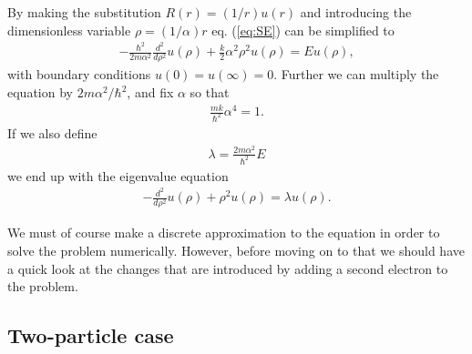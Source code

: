 \documentclass[12pt, a4paper]{article}
\begin{document}
By making the substitution $R(r) = (1/r)u(r)$ and introducing the dimensionless variable 
$\rho = (1/\alpha)r$ eq. (\ref{eq:SE}) can be simplified to 
\begin{align*}
-\frac{\hbar^2}{2m\alpha^2} \frac{d^2}{d\rho^2}u(\rho) + \frac{k}{2}\alpha^2 \rho^2 u(\rho) = Eu(\rho),  
\end{align*} 
with boundary conditions $u(0) = u(\infty) = 0$. 
Further we can multiply the equation by $2m\alpha^2/\hbar^2$, and fix $\alpha$ so that 
\begin{align*}
\frac{mk}{\hbar^2}\alpha^4 = 1.  
\end{align*}
If we also define 
\begin{align*}
\lambda = \frac{2m \alpha^2}{\hbar^2}E 
\end{align*}
we end up with the eigenvalue equation 
\begin{align}
- \frac{d^2}{d\rho^2}u(\rho) + \rho^2u(\rho) = \lambda u(\rho). 
\label{eq:SE_1p_scaled}
\end{align}

We must of course make a discrete approximation to the equation in order to solve the problem numerically. 
However, before moving on to that we should have a quick look at the changes that are introduced by 
adding a second electron to the problem. 

\subsection{Two-particle case}
\end{document}
